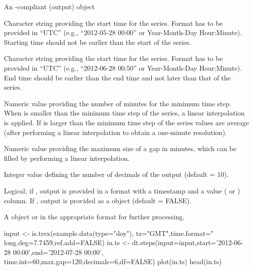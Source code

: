 \documentclass[a4paper]{book}
\begin{document}
\begin{Arguments}
\begin{ldescription}
\item[\code{input}] An -compliant (output) object

\item[\code{start}] Character string providing the start time for the series.
Format has to be provided in “UTC” (e.g., “2012-05-28 00:00” or
Year-Month-Day Hour:Minute). Starting time should not be earlier
than the start of the series.

\item[\code{end}] Character string providing the start time for the series.
Format has to be provided in “UTC” (e.g., “2012-06-28 00:50” or
Year-Month-Day Hour:Minute). End time should be earlier than
the end time and not later than that of the series.

\item[\code{time.int}] Numeric value providing the number of minutes for the
minimum time step. When  is smaller than the minimum time step
of the series, a linear interpolation is applied. If  is
larger than the minimum time step of the series values are average
(after performing a linear interpolation to obtain a one-minute resolution).

\item[\code{max.gap}] Numeric value providing the maximum size of a gap in minutes,
which can be filled by performing a linear interpolation.

\item[\code{decimals}] Integer value defining the number of decimals of the output
(default = 10).

\item[\code{df}] Logical; if , output is provided in a 
format with a timestamp and a value ( or ) column.
If , output is provided as a  object (default = FALSE).
\end{ldescription}
\end{Arguments}
%
\begin{Value}
A  object or  in the appropriate
format for further processing.
\end{Value}
%
\begin{Examples}
\begin{ExampleCode}
input <- is.trex(example.data(type="doy"),
           tz="GMT",time.format="%
           long.deg=7.7459,ref.add=FALSE)
in.ts <- dt.steps(input=input,start='2012-06-28 00:00',end='2012-07-28 00:00',
                   time.int=60,max.gap=120,decimals=6,df=FALSE)
plot(in.ts)
head(in.ts)

\end{ExampleCode}
\end{Examples}
\end{document}
